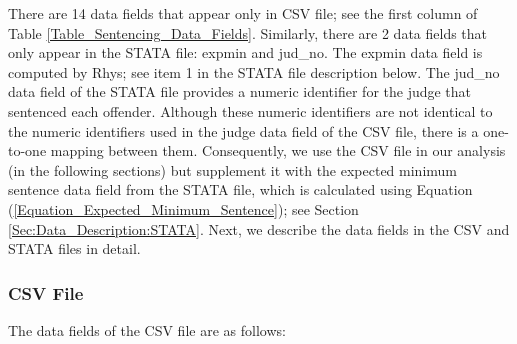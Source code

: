 \documentclass[11pt, oneside]{article}   	%
\theoremstyle{ModifiedStyle}
\begin{document}
  	There are 14 data fields that appear only in CSV file; see the first column of Table \ref{Table_Sentencing_Data_Fields}. Similarly, there are 2 data fields that only appear in the STATA file: expmin and jud\_no. The expmin data field is computed by Rhys; see item 1 in the STATA file description below. The jud\_no data field of the STATA file provides a numeric identifier for the judge that sentenced each offender. Although these numeric identifiers are not identical to the numeric identifiers used in the judge data field of the CSV file, there is a one-to-one mapping between them. Consequently, we use the CSV file in our analysis (in the following sections) but supplement it with the expected minimum sentence data field from the STATA file, which is calculated using Equation (\ref{Equation_Expected_Minimum_Sentence}); see Section \ref{Sec:Data_Description:STATA}. Next, we describe the data fields in the CSV and STATA files in detail.

  	\subsubsection{CSV File}
    	\label{Sec:Data_Description:CSV}
      The data fields of the CSV file are as follows:
\end{document}
